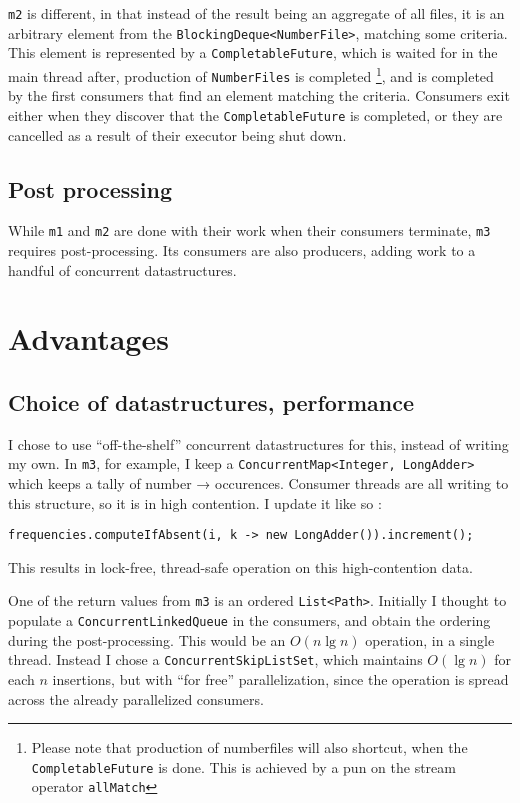 \documentclass[a4paper,11pt]{article}
\begin{document}
\texttt{m2} is different, in that instead of the result being an
aggregate of all files, it is an arbitrary element from the
\texttt{BlockingDeque<NumberFile>}, matching some criteria.  This
element is represented by a \texttt{CompletableFuture}, which is
waited for in the main thread after, production of
\texttt{NumberFiles} is completed
\footnote{Please note that
  production of numberfiles will also shortcut, when the
  \texttt{CompletableFuture} is done.  This is achieved by a pun on
  the stream operator \texttt{allMatch}
}, and is completed by
the first consumers that find an element matching the criteria.
Consumers exit either when they discover that the
\texttt{CompletableFuture} is completed, or they are cancelled as a
result of their executor being shut down.

\subsection{Post processing}

While \texttt{m1} and \texttt{m2} are done with their work when their
consumers terminate, \texttt{m3} requires post-processing.  Its
consumers are also producers, adding work to a handful of concurrent
datastructures.   

\section{Advantages}

\subsection{Choice of datastructures, performance}

I chose to use ``off-the-shelf'' concurrent datastructures for this,
instead of writing my own.  In \texttt{m3}, for example, I keep a
\texttt{ConcurrentMap<Integer, LongAdder>} which keeps a tally of
number → occurences.  Consumer threads are all writing to this
structure, so it is in high contention.  I update it like so
:

\begin{verbatim}
frequencies.computeIfAbsent(i, k -> new LongAdder()).increment();
\end{verbatim}

This results in lock-free, thread-safe operation on this
high-contention data.

One of the return values from \texttt{m3} is an ordered
\texttt{List<Path>}.  Initially I thought to populate a
\texttt{ConcurrentLinkedQueue} in the consumers, and obtain the
ordering during the post-processing.  This would be an \(O(n \lg n) \)
operation, in a single thread.  Instead I chose a
\texttt{ConcurrentSkipListSet}, which maintains $O(\lg n)$ for each
$n$ insertions, but with ``for free'' parallelization, since the
operation is spread across the already parallelized consumers.
\end{document}
